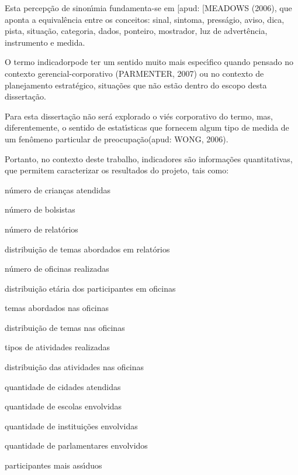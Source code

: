 \documentclass[
12pt,		%
openright,	%
twoside,  %
a4paper,			%
chapter=TITLE,		%
english,			%
french,				%
spanish,			%
brazil				%
]{USPSC-classe/USPSC_RedarTex}
\begin{document}
Esta percep\c{c}\~ao de sinon\'{\i}mia fundamenta-se em [apud: [MEADOWS (2006), que aponta a equival\^encia entre os conceitos: sinal, sintoma, press\'agio, aviso, dica, pista, situa\c{c}\~ao, categoria, dados, ponteiro, mostrador, luz de advert\^encia, instrumento e medida.










O termo \textquotedbl indicador\textquotedbl  pode ter um sentido muito mais espec\'{\i}fico quando pensado no contexto gerencial-corporativo (PARMENTER, 2007) ou no contexto de planejamento estrat\'egico, situa\c{c}\~oes que n\~ao est\~ao dentro do escopo desta disserta\c{c}\~ao.










Para esta disserta\c{c}\~ao n\~ao ser\'a explorado o vi\'es corporativo do termo, mas, diferentemente, o sentido de \textquotedbl estat\'{\i}sticas que fornecem algum tipo de medida de um fen\^omeno particular de preocupa\c{c}\~ao\textquotedbl  (apud: WONG, 2006).










Portanto, no contexto deste trabalho, indicadores s\~ao informa\c{c}\~oes quantitativas, que permitem caracterizar os resultados do projeto, tais como:











\begin{alineas}
\item n\'umero de crian\c{c}as atendidas
\item n\'umero de bolsistas
\item n\'umero de relat\'orios
\item distribui\c{c}\~ao de temas abordados em relat\'orios
\item n\'umero de oficinas realizadas
\item distribui\c{c}\~ao et\'aria dos participantes em oficinas
\item temas abordados nas oficinas
\item distribui\c{c}\~ao de temas nas oficinas
\item tipos de atividades realizadas
\item distribui\c{c}\~ao das atividades nas oficinas
\item quantidade de cidades atendidas
\item quantidade de escolas envolvidas
\item quantidade de institui\c{c}\~oes envolvidas
\item quantidade de parlamentares envolvidos
\item participantes mais ass\'{\i}duos
\end{alineas}
\end{document}

